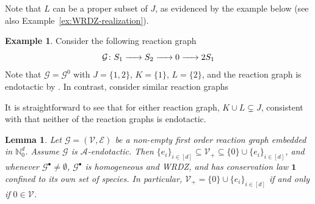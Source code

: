 \documentclass[10pt]{amsart}
\numberwithin{equation}{section}
\theoremstyle{plain}
\newtheorem{lemma}[theorem]{Lemma}
\theoremstyle{definition}
\newtheorem{example}[theorem]{Example}
\theoremstyle{remark}
\newcommand{\cA}{\mathcal{A}}
\newcommand{\cE}{\mathcal{E}}
\newcommand{\cG}{\mathcal{G}}
\newcommand{\cV}{\mathcal{V}}
\begin{document}
Note that $L$ can be a proper subset of $J$, as evidenced by the example below (see also Example~\ref{ex:WRDZ-realization}).
\begin{example}\label{ex:semi-connectivity}
 Consider the following reaction graph
\[\cG\colon S_1\ce{->}S_2\ce{->}0\ce{->}2S_1\]
Note that $\cG=\cG^0$ with $J=\{1,2\}$, $K=\{1\}$,  $L=\{2\}$, and the reaction graph is endotactic by \cite[Proposition~4.1]{CNP13}. In contrast, consider  similar reaction graphs
\begin{center}
\end{center}
It is straightforward to see that for either reaction graph, $K\cup L\subsetneq J$, consistent with that neither of the reaction graphs is endotactic.
\end{example}
\begin{lemma}\label{le:first-order-reactions}
Let $\mathcal{G}=(\cV,\cE)$ be a non-empty  first order reaction graph  embedded in $\mathbb{N}^d_0$.  Assume $\cG$ is $\cA$-endotactic.  Then $\{e_i\}_{i\in[d]}\subseteq\mathcal{V}_+\subseteq\{0\}\cup\{e_i\}_{i\in[d]}$, and whenever $\cG^{\bullet}\neq\emptyset$,  $\cG^{\bullet}$ is homogeneous and WRDZ, and has conservation law $\mathbf{1}$ confined to its own set of  species. In particular, 
$\mathcal{V}_+=\{0\}\cup\{e_i\}_{i\in[d]}$ if and only if $0\in\cV$.
\end{lemma}
\end{document}
